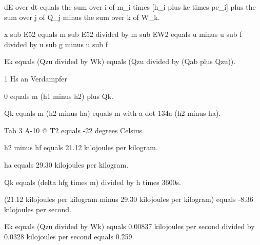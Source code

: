 dE over dt equals the sum over i of m_i times [h_i plus ke times pe_i] plus the sum over j of Q_j minus the sum over k of W_k.

x sub E52 equals m sub E52 divided by m sub EW2 equals u minus u sub f divided by u sub g minus u sub f

Ek equals (Qzu divided by Wk) equals (Qzu divided by (Qab plus Qzu)).

1 Hs an Verdampfer

0 equals m (h1 minus h2) plus Qk.

Qk equals m (h2 minus ha) equals m with a dot 134a (h2 minus ha).

Tab 3 A-10 @ T2 equals -22 degrees Celsius.

h2 minus hf equals 21.12 kilojoules per kilogram.

ha equals 29.30 kilojoules per kilogram.

Qk equals (delta hfg times m) divided by h times 3600s.

(21.12 kilojoules per kilogram minus 29.30 kilojoules per kilogram) equals -8.36 kilojoules per second.

Ek equals (Qzu divided by Wk) equals 0.00837 kilojoules per second divided by 0.0328 kilojoules per second equals 0.259.
